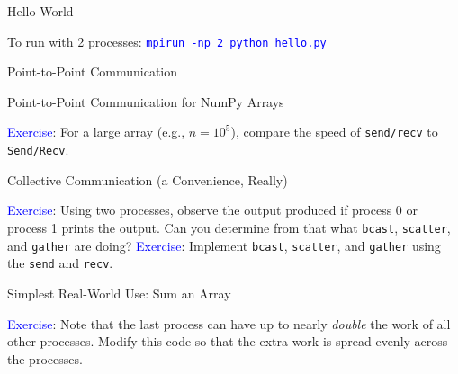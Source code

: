 \documentclass[10pt,handout]{beamer}
\begin{document}
\begin{frame}{Hello World}



\vfill 

To run with 2 processes: \textcolor{blue}{{\tt mpirun -np 2 python hello.py}}

\end{frame}

\begin{frame}{Point-to-Point Communication}



\end{frame}

\begin{frame}{Point-to-Point Communication for NumPy Arrays}


\vfill 
\textcolor{blue}{Exercise}: 
For a large array (e.g., $n=10^5$), compare the speed of {\tt send/recv} to 
{\tt Send/Recv}.

\end{frame}


\begin{frame}{Collective Communication (a Convenience, Really)}



\vfill 
\textcolor{blue}{Exercise}: 
Using two processes, observe the output produced if process 0 
or process 1 prints the output.  Can you determine from that 
what {\tt bcast}, {\tt scatter}, and {\tt gather} are doing? 
\vfill
\textcolor{blue}{Exercise}: 
Implement {\tt bcast}, {\tt scatter}, and {\tt gather} using 
the {\tt send} and {\tt recv}.
\end{frame}

\begin{frame}{Simplest Real-World Use: Sum an Array}




\vfill 

\textcolor{blue}{Exercise}: 
Note that the last process can have up to nearly {\it double} the 
work of all other processes.  Modify this code so that the extra
work is spread evenly across the processes.

\end{frame}
\end{document}
